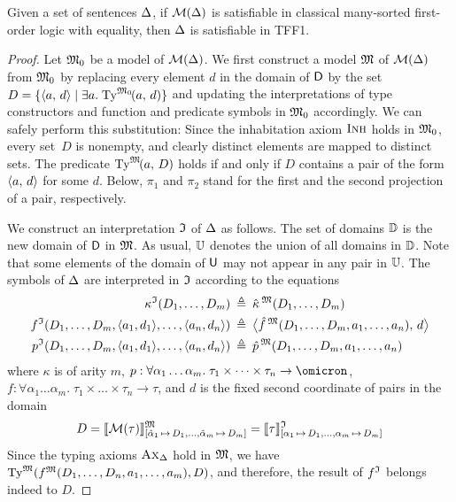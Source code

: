 \begin{theorem} \label{thm:mon_compl}
Given a set of sentences $\mathrm{\Delta}$, if $\mathcal{M}(\mathrm{\Delta})$
is satisfiable in classical many-sorted first-order logic
with equality, then $\mathrm{\Delta}$ is satisfiable in TFF1.
\end{theorem}
\begin{proof}
Let $\mathfrak{M}_0$ be a model of $\mathcal{M}(\mathrm{\Delta})$. We first construct a model $\mathfrak{M}$ of $\mathcal{M}(\mathrm{\Delta})$
from $\mathfrak{M}_0$ by replacing every element $d$ in
the domain of $\mathsf{D}$ by the set $D = \{\langle a,\,d \rangle \mid \exists a.\; \mathrm{Ty}^{\mathfrak{M}_0\!}(a,\,d)\}$
and updating the interpretations of type constructors
and function and predicate symbols in $\mathfrak{M}_0$ accordingly.
We can safely perform this substitution: Since the inhabitation
axiom $\text{\sc Inh}$ holds in $\mathfrak{M}_0$, every set~$D$ is nonempty, and clearly distinct
elements are mapped to distinct sets.
The predicate $\mathrm{Ty}^{\mathfrak{M}\!}(a,\,D)$ holds if and only if
$D$ contains a pair of the form $\langle a,\, d \rangle$ for some $d$.
%
Below, $\pi_1$ and $\pi_2$ stand for the first and the second projection
of a pair, respectively.

We construct an interpretation $\mathfrak{I}$ of $\mathrm{\Delta}$ as follows.
The set of domains $\mathbb{D}$ is the new domain
of $\mathsf{D}$ in $\mathfrak{M}$. As usual, $\mathbb{U}$ denotes the union
of all domains in $\mathbb{D}$. Note that some elements of
the domain of $\mathsf{U}$ may not appear in any pair in $\mathbb{U}$.
%
The symbols of $\mathrm{\Delta}$ are interpreted in $\mathfrak{I}$
according to the equations
\begin{align*}
\kappa^{\mathfrak{I}}(D_1,\dots,D_m) &\:\triangleq\: \hat{\kappa}{\,}^{\mathfrak{M}}(D_1,\dots,D_m) \\
f^{\mathfrak{I}}(D_1,\dots,D_m,\langle a_1,d_1 \rangle,\dots,\langle a_n,d_n \rangle) &\:\triangleq\:
\bigl\langle \hat{f}{\,}^{\mathfrak{M}}(D_1,\dots,D_m,a_1,\dots,a_n),\, d \bigr\rangle \\
p^{\mathfrak{I}}(D_1,\dots,D_m,\langle a_1,d_1 \rangle,\dots,\langle a_n,d_n \rangle) &\:\triangleq\:
\hat{p}{\,}^{\mathfrak{M}}(D_1,\dots,D_m,a_1,\dots,a_n)
\end{align*}
where
$\kappa$ is of arity $m$,
$p : \forall \alpha_1\dots\alpha_m .\; \tau_1 \times \dots \times \tau_n \to
\omicron$,
$f : \forall \alpha_1\dots\alpha_m .\; \tau_1 \times \dots \times \tau_n \to \tau$,
and $d$ is the fixed second coordinate of pairs in the domain
%
\[D = \llbracket \mathcal{M}(\tau) \rrbracket^{\mathfrak{M}}_{[\hat{\alpha}_1\,\mapsto\,D_1,\dots,
\hat{\alpha}_m\,\mapsto\,D_m]} =
\llbracket \tau \rrbracket^{\mathfrak{I}}_{[\alpha_1\,\mapsto\,D_1,\dots,\alpha_m\,\mapsto\,D_m]}\]%
%
Since the typing axioms $\text{\sc Ax}_{\mathrm{\Delta}}$ hold in $\mathfrak{M}$, we have
$\mathrm{Ty}^{\mathfrak{M}}(f^{\mathfrak{M}}(D_1,\dots,D_n,a_1,\dots,a_m), D)$,
and therefore, the result of $f^{\mathfrak{I}}$ belongs indeed to $D$.


\end{proof}
